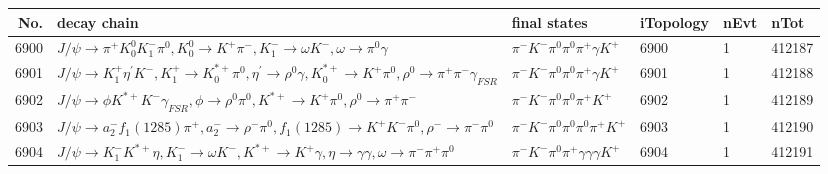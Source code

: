 \begin{table}[htbp] 
\begin{center}
\begin{small}
\begin{tabular}{rlllll}\hline\hline
 No. & decay chain & final states &  iTopology & nEvt & nTot \\\hline
6900&$J/\psi       \rightarrow \pi^{+}        K_0^{0}        K_{1}^{-}      \pi^{0}        , K_0^{0}         \rightarrow K^{+}          \pi^{-}        , K_{1}^{-}       \rightarrow \omega         K^{-}          , \omega          \rightarrow \pi^{0}        \gamma       $&$\pi^{-}        K^{-}          \pi^{0}        \pi^{0}        \pi^{+}        \gamma       K^{+}          $& 6900&    1&412187\\
6901&$J/\psi       \rightarrow K_1^{+}        \eta^{\prime} K^{-}          , K_1^{+}         \rightarrow K_{0}^{*+}     \pi^{0}        , \eta^{\prime}  \rightarrow \rho^{0}      \gamma       , K_{0}^{*+}      \rightarrow K^{+}          \pi^{0}        , \rho^{0}       \rightarrow \pi^{+}        \pi^{-}        \gamma_{FSR} $&$\pi^{-}        K^{-}          \pi^{0}        \pi^{0}        \pi^{+}        \gamma       K^{+}          $& 6901&    1&412188\\
6902&$J/\psi       \rightarrow \phi           K^{*+}         K^{-}          \gamma_{FSR} , \phi            \rightarrow \rho^{0}      \pi^{0}        , K^{*+}          \rightarrow K^{+}          \pi^{0}        , \rho^{0}       \rightarrow \pi^{+}        \pi^{-}        $&$\pi^{-}        K^{-}          \pi^{0}        \pi^{0}        \pi^{+}        K^{+}          $& 6902&    1&412189\\
6903&$J/\psi       \rightarrow a_{2}^{-}      f_{1}(1285)    \pi^{+}        , a_{2}^{-}       \rightarrow \rho^{-}      \pi^{0}        , f_{1}(1285)     \rightarrow K^{+}          K^{-}          \pi^{0}        , \rho^{-}       \rightarrow \pi^{-}        \pi^{0}        $&$\pi^{-}        K^{-}          \pi^{0}        \pi^{0}        \pi^{0}        \pi^{+}        K^{+}          $& 6903&    1&412190\\
6904&$J/\psi       \rightarrow K_{1}^{-}      K^{*+}         \eta          , K_{1}^{-}       \rightarrow \omega         K^{-}          , K^{*+}          \rightarrow K^{+}          \gamma       , \eta           \rightarrow \gamma       \gamma       , \omega          \rightarrow \pi^{-}        \pi^{+}        \pi^{0}        $&$\pi^{-}        K^{-}          \pi^{0}        \pi^{+}        \gamma       \gamma       \gamma       K^{+}          $& 6904&    1&412191\\

\end{tabular}
\end{small}
\end{center}
\end{table}
